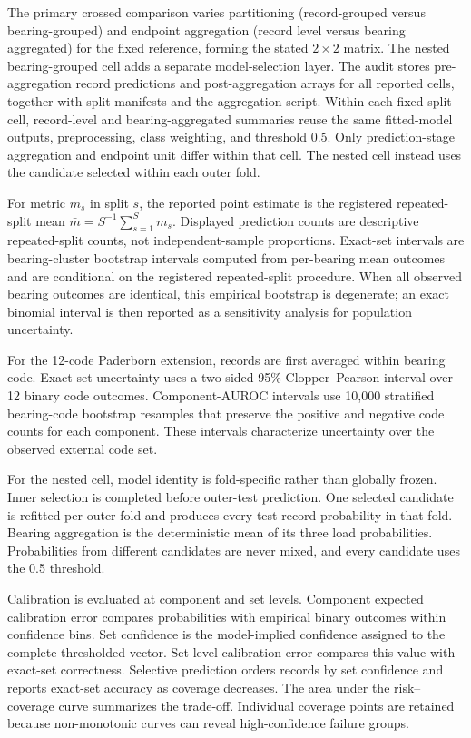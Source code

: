 \documentclass[machines,article,submit,oneauthor,pdftex]{Definitions/mdpi}
\begin{document}
The primary crossed comparison varies partitioning (record-grouped versus bearing-grouped) and endpoint aggregation (record level versus bearing aggregated) for the fixed reference, forming the stated $2\times2$ matrix. The nested bearing-grouped cell adds a separate model-selection layer. The audit stores pre-aggregation record predictions and post-aggregation arrays for all reported cells, together with split manifests and the aggregation script. Within each fixed split cell, record-level and bearing-aggregated summaries reuse the same fitted-model outputs, preprocessing, class weighting, and threshold 0.5. Only prediction-stage aggregation and endpoint unit differ within that cell. The nested cell instead uses the candidate selected within each outer fold.

For metric $m_s$ in split $s$, the reported point estimate is the registered repeated-split mean $\bar m=S^{-1}\sum_{s=1}^{S}m_s$. Displayed prediction counts are descriptive repeated-split counts, not independent-sample proportions. Exact-set intervals are bearing-cluster bootstrap intervals computed from per-bearing mean outcomes and are conditional on the registered repeated-split procedure. When all observed bearing outcomes are identical, this empirical bootstrap is degenerate; an exact binomial interval is then reported as a sensitivity analysis for population uncertainty.

For the 12-code Paderborn extension, records are first averaged within bearing code. Exact-set uncertainty uses a two-sided 95\% Clopper--Pearson interval over 12 binary code outcomes. Component-AUROC intervals use 10,000 stratified bearing-code bootstrap resamples that preserve the positive and negative code counts for each component. These intervals characterize uncertainty over the observed external code set.

For the nested cell, model identity is fold-specific rather than globally frozen. Inner selection is completed before outer-test prediction. One selected candidate is refitted per outer fold and produces every test-record probability in that fold. Bearing aggregation is the deterministic mean of its three load probabilities. Probabilities from different candidates are never mixed, and every candidate uses the 0.5 threshold.

Calibration is evaluated at component and set levels. Component expected calibration error compares probabilities with empirical binary outcomes within confidence bins. Set confidence is the model-implied confidence assigned to the complete thresholded vector. Set-level calibration error compares this value with exact-set correctness. Selective prediction orders records by set confidence and reports exact-set accuracy as coverage decreases. The area under the risk--coverage curve summarizes the trade-off. Individual coverage points are retained because non-monotonic curves can reveal high-confidence failure groups.
\end{document}
